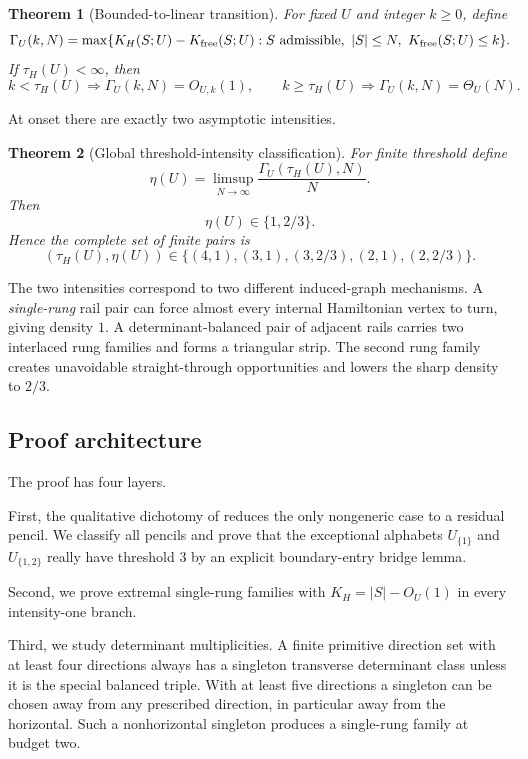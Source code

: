 \documentclass[11pt]{article}
\newtheorem{theorem}{Theorem}[section]
\theoremstyle{definition}
\begin{document}
\begin{theorem}[Bounded-to-linear transition]\label{thm:Gamma-jump}
For fixed $U$ and integer $k\ge0$, define
\[
\Gamma_U(k,N)=\max\{K_H(S;U)-K_{\rm free}(S;U): S\text{ admissible},\ |S|\le N,\ K_{\rm free}(S;U)\le k\}.
\]
If $\tau_H(U)<\infty$, then
\[
\boxed{
 k<\tau_H(U)\Longrightarrow \Gamma_U(k,N)=O_{U,k}(1),
 \qquad
 k\ge\tau_H(U)\Longrightarrow \Gamma_U(k,N)=\Theta_U(N).}
\]
\end{theorem}

At onset there are exactly two asymptotic intensities.

\begin{theorem}[Global threshold-intensity classification]\label{thm:global-eta}
For finite threshold define
\[
\eta(U)=\limsup_{N\to\infty}\frac{\Gamma_U(\tau_H(U),N)}{N}.
\]
Then
\[
\boxed{\eta(U)\in\{1,2/3\}.}
\]
Hence the complete set of finite pairs is
\[
\boxed{(\tau_H(U),\eta(U))\in
\{(4,1),(3,1),(3,2/3),(2,1),(2,2/3)\}.}
\]
\end{theorem}

The two intensities correspond to two different induced-graph mechanisms.  A \emph{single-rung} rail pair can force almost every internal Hamiltonian vertex to turn, giving density $1$.  A determinant-balanced pair of adjacent rails carries two interlaced rung families and forms a triangular strip.  The second rung family creates unavoidable straight-through opportunities and lowers the sharp density to $2/3$.

\subsection{Proof architecture}
The proof has four layers.

First, the qualitative dichotomy of \cite{RosalesPaperIIII} reduces the only nongeneric case to a residual pencil.  We classify all pencils and prove that the exceptional alphabets $U_{\{1\}}$ and $U_{\{1,2\}}$ really have threshold $3$ by an explicit boundary-entry bridge lemma.

Second, we prove extremal single-rung families with $K_H=|S|-O_U(1)$ in every intensity-one branch.

Third, we study determinant multiplicities.  A finite primitive direction set with at least four directions always has a singleton transverse determinant class unless it is the special balanced triple.  With at least five directions a singleton can be chosen away from any prescribed direction, in particular away from the horizontal.  Such a nonhorizontal singleton produces a single-rung family at budget two.
\end{document}
